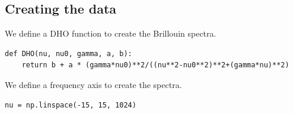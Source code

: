 \documentclass{article}
\begin{document}
\subsection{Creating the data}

We define a DHO function to create the Brillouin spectra.

\begin{lstlisting}
def DHO(nu, nu0, gamma, a, b):
    return b + a * (gamma*nu0)**2/((nu**2-nu0**2)**2+(gamma*nu)**2)
\end{lstlisting}

We define a frequency axis to create the spectra.

\begin{lstlisting}
nu = np.linspace(-15, 15, 1024)
\end{lstlisting}
\end{document}
